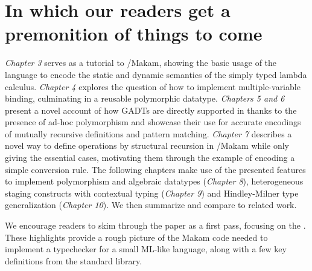 \section{In which our readers get a premonition of things to
come}\label{in-which-our-readers-get-a-premonition-of-things-to-come}

\identNormal

\emph{Chapter 3} serves as a tutorial to \lamprolog/Makam, showing the
basic usage of the language to encode the static and dynamic semantics
of the simply typed lambda calculus. \emph{Chapter 4} explores the
question of how to implement multiple-variable binding, culminating in a
reusable polymorphic datatype. \emph{Chapters 5 and 6} present a novel
account of how GADTs are directly supported in \lamprolog thanks to the
presence of ad-hoc polymorphism and showcase their use for accurate
encodings of mutually recursive definitions and pattern matching.
\emph{Chapter 7} describes a novel way to define operations by
structural recursion in \lamprolog/Makam while only giving the essential
cases, motivating them through the example of encoding a simple
conversion rule. The following chapters make use of the presented
features to implement polymorphism and algebraic datatypes
(\emph{Chapter 8}), heterogeneous staging constructs with contextual
typing (\emph{Chapter 9}) and Hindley-Milner type generalization
(\emph{Chapter 10}). We then summarize and compare to related work.

We encourage readers to skim through the paper as a first pass, focusing
on the . These highlights provide a
rough picture of the Makam code needed to implement a typechecker for a
small ML-like language, along with a few key definitions from the
standard library.

\identDialog
